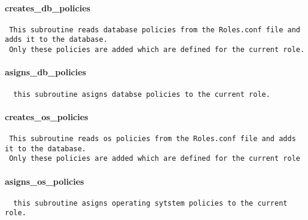 \paragraph*{creates\_db\_policies\label{Apiis::Auth::AccessControl_--_used_by_the_runall_pl_and_access_control_pl_scripts_to_define_user_access_rights_creates_db_policies}}
\begin{verbatim}
 This subroutine reads database policies from the Roles.conf file and adds it to the database.
 Only these policies are added which are defined for the current role.
\end{verbatim}
\paragraph*{asigns\_db\_policies\label{Apiis::Auth::AccessControl_--_used_by_the_runall_pl_and_access_control_pl_scripts_to_define_user_access_rights_asigns_db_policies}}
\begin{verbatim}
  this subroutine asigns databse policies to the current role.
\end{verbatim}
\paragraph*{creates\_os\_policies\label{Apiis::Auth::AccessControl_--_used_by_the_runall_pl_and_access_control_pl_scripts_to_define_user_access_rights_creates_os_policies}}
\begin{verbatim}
 This subroutine reads os policies from the Roles.conf file and adds it to the database.
 Only these policies are added which are defined for the current role
\end{verbatim}
\paragraph*{asigns\_os\_policies\label{Apiis::Auth::AccessControl_--_used_by_the_runall_pl_and_access_control_pl_scripts_to_define_user_access_rights_asigns_os_policies}}
\begin{verbatim}
  this subroutine asigns operating sytstem policies to the current role.
\end{verbatim}

